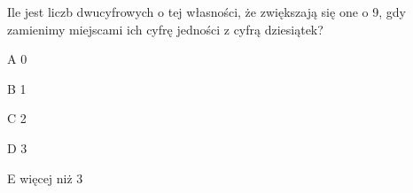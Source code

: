 \begin{tresc}
Ile jest liczb dwucyfrowych o tej własności, że zwiększają się one o 9, gdy zamienimy miejscami ich cyfrę jedności z cyfrą dziesiątek?
\end{tresc}
\begin{wariant}{A} 0 \end{wariant}
\begin{wariant}{B} 1 \end{wariant}
\begin{wariant}{C} 2 \end{wariant}
\begin{wariant}{D} 3 \end{wariant}
\begin{wariant}{E} więcej niż 3 \end{wariant}
